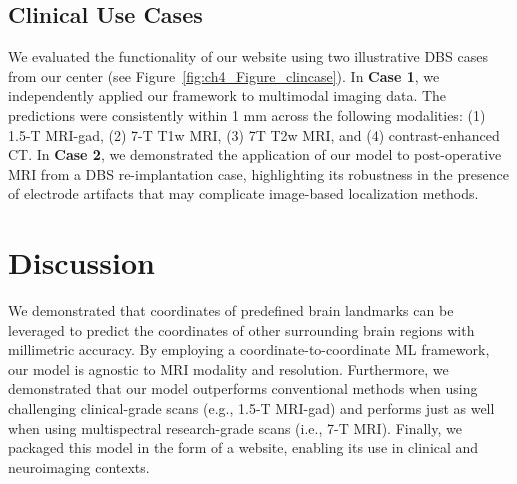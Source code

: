 \subsection{Clinical Use Cases}
We evaluated the functionality of our website using two illustrative DBS cases from our center (see Figure~\ref{fig:ch4_Figure_clincase}). In \textbf{Case 1}, we independently applied our framework to multimodal imaging data. The predictions were consistently within 1 mm across the following modalities: (1) 1.5-T MRI-gad, (2) 7-T T1w MRI, (3) 7T T2w MRI, and (4) contrast-enhanced CT. In \textbf{Case 2}, we demonstrated the application of our model to post-operative MRI from a DBS re-implantation case, highlighting its robustness in the presence of electrode artifacts that may complicate image-based localization methods.

\section{Discussion}
We demonstrated that coordinates of predefined brain landmarks can be leveraged to predict the coordinates of other surrounding brain regions with millimetric accuracy. By employing a coordinate-to-coordinate ML framework, our model is agnostic to MRI modality and resolution. Furthermore, we demonstrated that our model outperforms conventional methods when using challenging clinical-grade scans (e.g., 1.5-T MRI-gad) and performs just as well when using multispectral research-grade scans (i.e., 7-T MRI). Finally, we packaged this model in the form of a website, enabling its use in clinical and neuroimaging contexts.

